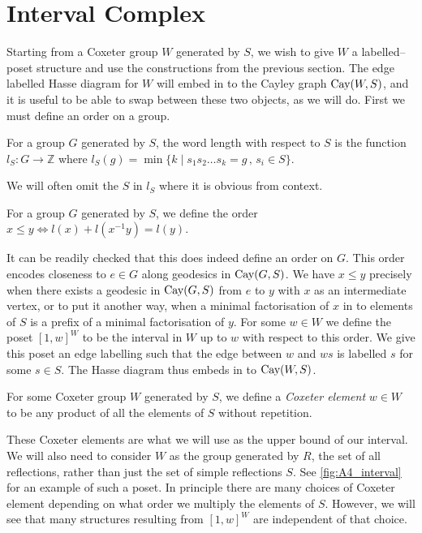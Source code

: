 \documentclass[class=article, crop=false]{standalone}
\begin{document}
\section{Interval Complex}
\label{sec:interval_cx}
Starting from a Coxeter group $W$ generated by $S$, we wish to give $W$ a labelled--poset structure and use the constructions from the previous section. The edge labelled Hasse diagram for $W$ will embed in to the Cayley graph $\text{Cay}(W,S)$, and it is useful to be able to swap between these two objects, as we will do. First we must define an order on a group.

\begin{definition}
    For a group $G$ generated by $S$, the word length with respect to $S$ is the function $l_S:G\to \mathbb{Z}$ where $l_S(g) = \min\{k \mid s_1s_2\ldots s_k=g \,,\, s_i \in S \}$.
\end{definition}

We will often omit the $S$ in $l_S$ where it is obvious from context.

\begin{definition}
    For a group $G$ generated by $S$, we define the order $x \leq y \iff l(x) + l(x^{-1}y) = l(y)$.
\end{definition}

It can be readily checked that this does indeed define an order on $G$. This order encodes closeness to $e \in G$ along geodesics in $\text{Cay}(G,S)$. We have $x \leq y$ precisely when there exists a geodesic in $\text{Cay}(G, S)$ from $e$ to $y$ with $x$ as an intermediate vertex, or to put it another way, when a minimal factorisation of $x$ in to elements of $S$ is a prefix of a minimal factorisation of $y$.
For some $w \in W$ we define the poset $[1,w]^W$ to be the interval in $W$ up to $w$ with respect to this order. We give this poset an edge labelling such that the edge between $w$ and $ws$ is labelled $s$ for some $s \in S$. The Hasse diagram thus embeds in to $\text{Cay}(W,S)$.

\begin{definition}
	For some Coxeter group $W$ generated by $S$, we define a \emph{Coxeter element} $w\in W$ to be any product of all the elements of $S$ without repetition.
\end{definition}

These Coxeter elements are what we will use as the upper bound of our interval. We will also need to consider $W$ as the group generated by $R$, the set of all reflections, rather than just the set of simple reflections $S$. See \cref{fig:A4_interval} for an example of such a poset. In principle there are many choices of Coxeter element depending on what order we multiply the elements of $S$. 
However, we will see that many structures resulting from $[1,w]^W$ are independent of that choice.
\end{document}

